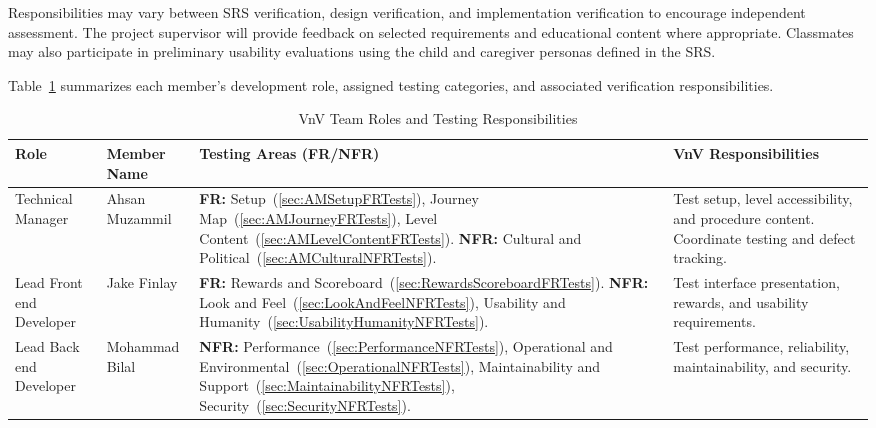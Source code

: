 \documentclass[10pt,titlepage]{article}
\begin{document}
Responsibilities may vary between SRS verification, design
verification, and implementation verification to encourage
independent assessment. The project supervisor will provide
feedback on selected requirements and educational content
where appropriate. Classmates may also participate in
preliminary usability evaluations using the child and
caregiver personas defined in the SRS. 

Table~\ref{tab:VnVTeam} summarizes each member's
development role, assigned testing categories, and
associated verification responsibilities. 



\begin{table}[H]
\centering
\footnotesize
\setlength{\tabcolsep}{3pt}
\renewcommand{\arraystretch}{1.15}

\caption{VnV Team Roles and Testing Responsibilities}
\label{tab:VnVTeam}

\begin{tabularx}{\textwidth}{
    @{}
    >{\raggedright\arraybackslash}p{2.4cm}
    >{\raggedright\arraybackslash}p{2.3cm}
    >{\raggedright\arraybackslash}p{5.2cm}
    >{\raggedright\arraybackslash}X
    @{}
}
\toprule
\textbf{Role} &
\textbf{Member Name} &
\textbf{Testing Areas (FR/NFR)} &
\textbf{VnV Responsibilities} \\
\midrule

Technical Manager &
Ahsan Muzammil &
\textbf{FR:}
Setup~(\ref{sec:AMSetupFRTests}),
Journey Map~(\ref{sec:AMJourneyFRTests}),
Level Content~(\ref{sec:AMLevelContentFRTests}).
\newline
\textbf{NFR:}
Cultural and Political~(\ref{sec:AMCulturalNFRTests}). &
Test setup, level accessibility, and procedure content.
Coordinate testing and defect tracking. \\

\addlinespace[4pt]

Lead Front end
Developer &
Jake Finlay &
\textbf{FR:}
Rewards and Scoreboard~(\ref{sec:RewardsScoreboardFRTests}).
\newline
\textbf{NFR:}
Look and Feel~(\ref{sec:LookAndFeelNFRTests}),
Usability and Humanity~(\ref{sec:UsabilityHumanityNFRTests}). &
Test interface presentation, rewards,
and usability requirements. \\

\addlinespace[4pt]

Lead Back end
Developer &
Mohammad Bilal &
\textbf{NFR:}
Performance~(\ref{sec:PerformanceNFRTests}),
Operational and Environmental~(\ref{sec:OperationalNFRTests}),
Maintainability and Support~(\ref{sec:MaintainabilityNFRTests}),
Security~(\ref{sec:SecurityNFRTests}). &
Test performance, reliability,
maintainability, and security. \\


\end{tabularx}
\end{table}
\end{document}
